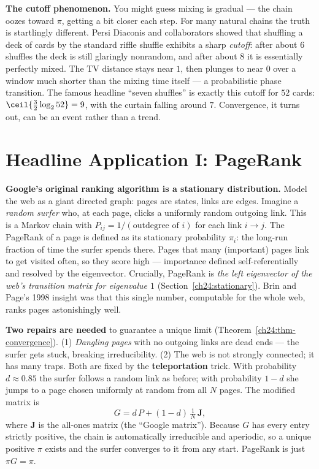 \begin{paradoxbox}
\textbf{The cutoff phenomenon.} You might guess mixing is gradual --- the chain
oozes toward $\pi$, getting a bit closer each step. For many natural chains the
truth is startlingly different. Persi Diaconis and collaborators showed that
shuffling a deck of cards by the standard riffle shuffle exhibits a sharp
\emph{cutoff}: after about $6$ shuffles the deck is still glaringly nonrandom, and
after about $8$ it is essentially perfectly mixed. The TV distance stays near $1$,
then plunges to near $0$ over a window much shorter than the mixing time itself ---
a probabilistic phase transition. The famous headline ``seven shuffles'' is
exactly this cutoff for $52$ cards: $\ceil{\tfrac32 \log_2 52} = 9$, with
the curtain falling around $7$. Convergence, it turns out, can be an event rather
than a trend.
\end{paradoxbox}

\section{Headline Application I: PageRank}
\label{ch24:pagerank}

\begin{applicationbox}
\textbf{Google's original ranking algorithm is a stationary distribution.} Model
the web as a giant directed graph: pages are states, links are edges. Imagine a
\emph{random surfer} who, at each page, clicks a uniformly random outgoing link.
This is a Markov chain with $P_{ij} = 1/(\text{outdegree of }i)$ for each link
$i\to j$. The PageRank of a page is defined as its stationary probability $\pi_i$:
the long-run fraction of time the surfer spends there. Pages that many
(important) pages link to get visited often, so they score high --- importance
defined self-referentially and resolved by the eigenvector. Crucially, PageRank
is \emph{the left eigenvector of the web's transition matrix for eigenvalue $1$}
(Section~\ref{ch24:stationary}). Brin and Page's 1998 insight was that this single
number, computable for the whole web, ranks pages astonishingly well.

\textbf{Two repairs are needed} to guarantee a unique limit
(Theorem~\ref{ch24:thm-convergence}). (1) \emph{Dangling pages} with no outgoing
links are dead ends --- the surfer gets stuck, breaking irreducibility. (2) The
web is not strongly connected; it has many traps. Both are fixed by the
\textbf{teleportation} trick. With probability $d \approx 0.85$ the surfer
follows a random link as before; with probability $1-d$ she jumps to a page chosen
uniformly at random from all $N$ pages. The modified matrix is
\[
  G = d\,P + (1-d)\,\tfrac{1}{N}\,\mathbf{J},
\]
where $\mathbf{J}$ is the all-ones matrix (the ``Google matrix''). Because $G$ has
every entry strictly positive, the chain is automatically irreducible and
aperiodic, so a unique positive $\pi$ exists and the surfer converges to it from
any start. PageRank is just $\pi G = \pi$.
\end{applicationbox}

